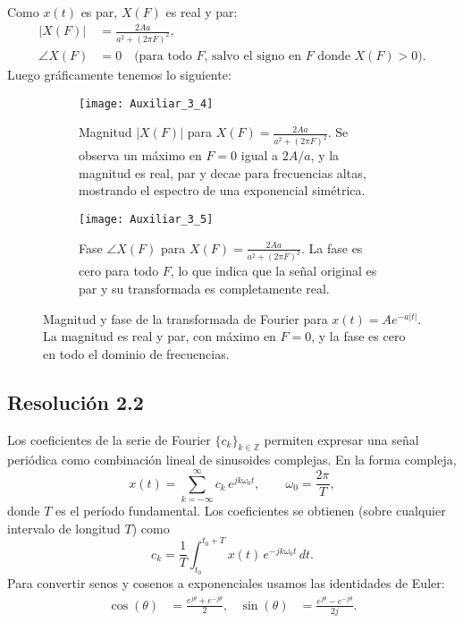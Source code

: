 \documentclass[
  11pt,
  letterpaper,
   addpoints,
   answers
  ]{exam}
\begin{document}
\begin{questions}
\begin{solution}
Como \(x(t)\) es par, \(X(F)\) es real y par:
\begin{align}
|X(F)|
  &= \frac{2A a}{a^{2}+(2\pi F)^{2}},\\
\angle X(F)
  &= 0\quad \text{(para todo \(F\), salvo el signo en \(F\) donde \(X(F)>0\))}.
\end{align}
Luego gráficamente tenemos lo siguiente:
\begin{figure}[H]
  \centering

  \begin{subfigure}[t]{0.48\textwidth}
    \centering
    \texttt{[image: Auxiliar\_3\_4]} %
    \caption{Magnitud $|X(F)|$ para $X(F)=\frac{2Aa}{a^2+(2\pi F)^2}$. Se observa un máximo en $F=0$ igual a $2A/a$, y la magnitud es real, par y decae para frecuencias altas, mostrando el espectro de una exponencial simétrica.}
    \label{fig:mag_XF}
  \end{subfigure}
  \hfill
  \begin{subfigure}[t]{0.48\textwidth}
    \centering
    \texttt{[image: Auxiliar\_3\_5]}
    \caption{Fase $\angle X(F)$ para $X(F)=\frac{2Aa}{a^2+(2\pi F)^2}$. La fase es cero para todo $F$, lo que indica que la señal original es par y su transformada es completamente real.}
    \label{fig:fase_XF2}
  \end{subfigure}

  \caption{Magnitud y fase de la transformada de Fourier para $x(t)=A e^{-a|t|}$. La magnitud es real y par, con máximo en $F=0$, y la fase es cero en todo el dominio de frecuencias.}
  \label{fig:mag_fase_XF2}
\end{figure}

\subsection*{Resolución 2.2}
Los coeficientes de la serie de Fourier \( \{c_k\}_{k\in\mathbb{Z}} \) permiten expresar una señal periódica como combinación lineal de sinusoides complejas. En la forma compleja,
\begin{equation}
x(t)=\sum_{k=-\infty}^{\infty} c_k\,e^{jk\omega_0 t}, 
\qquad \omega_0=\frac{2\pi}{T},
\end{equation}
donde \(T\) es el período fundamental. Los coeficientes se obtienen (sobre cualquier intervalo de longitud \(T\)) como
\begin{equation}
c_k=\frac{1}{T}\int_{t_0}^{t_0+T} x(t)\,e^{-jk\omega_0 t}\,dt .
\end{equation}
Para convertir senos y cosenos a exponenciales usamos las identidades de Euler:
\begin{align}
\cos(\theta) &= \frac{e^{j\theta}+e^{-j\theta}}{2}, &
\sin(\theta) &= \frac{e^{j\theta}-e^{-j\theta}}{2j}.
\end{align}


\end{solution}
\end{questions}
\end{document}
